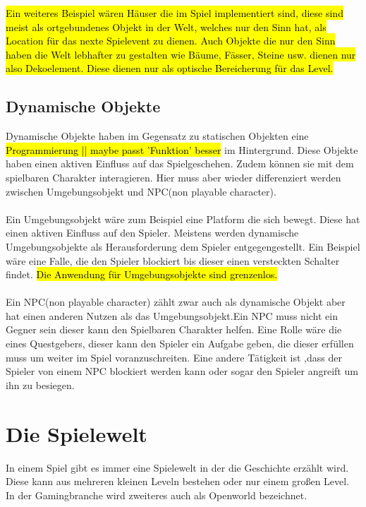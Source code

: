 \hl{
    Ein weiteres Beispiel wären Häuser die im Spiel implementiert sind, diese sind meist als ortgebundenes Objekt in der Welt, welches nur den Sinn hat, als Location für das nexte Spielevent zu dienen. Auch Objekte die nur den Sinn haben die Welt lebhafter zu gestalten wie Bäume, Fässer, Steine usw. dienen nur also Dekoelement. Diese dienen nur als optische Bereicherung für das Level. 
}

\subsection{Dynamische Objekte}
Dynamische Objekte haben im Gegensatz zu statischen Objekten eine \hl{Programmierung || maybe passt 'Funktion' besser} im Hintergrund. Diese Objekte haben einen aktiven Einfluss auf das Spielgeschehen. Zudem können sie mit dem spielbaren Charakter interagieren. Hier muss aber wieder differenziert werden zwischen Umgebungsobjekt und NPC(non playable character).\\\\ %
Ein Umgebungsobjekt wäre zum Beispiel eine Platform die sich bewegt. Diese hat einen aktiven Einfluss auf den Spieler. Meistens werden dynamische Umgebungsobjekte als Herausforderung dem Spieler entgegengestellt. Ein Beispiel wäre eine Falle, die den Spieler blockiert bis dieser einen versteckten Schalter findet. \hl{
    Die Anwendung für Umgebungsobjekte sind grenzenlos. %
}\\\\
Ein NPC(non playable character) zählt zwar auch als dynamische Objekt aber hat einen anderen Nutzen als das Umgebungsobjekt.Ein NPC muss nicht ein Gegner sein dieser kann den Spielbaren Charakter helfen. Eine Rolle wäre die eines Questgebers, dieser kann den Spieler ein Aufgabe geben, die dieser erfüllen muss um weiter im Spiel voranzuschreiten. Eine andere Tätigkeit ist ,dass der Spieler von einem NPC blockiert werden kann oder sogar den Spieler angreift um ihn zu besiegen.

\pagebreak

\section{Die Spielewelt}
In einem Spiel gibt es immer eine Spielewelt in der die Geschichte erzählt wird. Diese kann aus mehreren kleinen Leveln bestehen oder nur einem großen Level. In der Gamingbranche wird zweiteres auch als Openworld bezeichnet.


